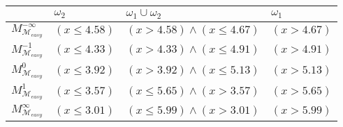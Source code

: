 \begin{tabular}{llll}
\toprule
 & $\omega_{2}$ & $\omega_{1} \cup \omega_{2}$ & $\omega_{1}$ \\
\midrule
$M^{-\infty}_{\mathcal{M}_{easy}}$ & $(x \leq 4.58)$ & $(x > 4.58) \wedge (x \leq 4.67)$ & $(x > 4.67)$ \\
$M^{-1}_{\mathcal{M}_{easy}}$ & $(x \leq 4.33)$ & $(x > 4.33) \wedge (x \leq 4.91)$ & $(x > 4.91)$ \\
$M^{0}_{\mathcal{M}_{easy}}$ & $(x \leq 3.92)$ & $(x > 3.92) \wedge (x \leq 5.13)$ & $(x > 5.13)$ \\
$M^{1}_{\mathcal{M}_{easy}}$ & $(x \leq 3.57)$ & $(x \leq 5.65) \wedge (x > 3.57)$ & $(x > 5.65)$ \\
$M^\infty_{\mathcal{M}_{easy}}$ & $(x \leq 3.01)$ & $(x \leq 5.99) \wedge (x > 3.01)$ & $(x > 5.99)$ \\
\bottomrule
\end{tabular}
